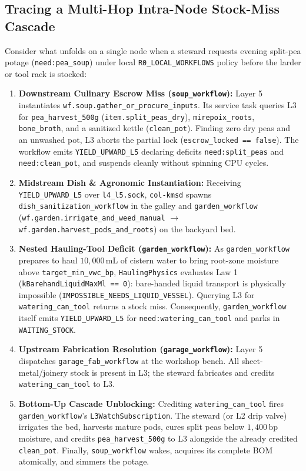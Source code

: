 \subsection{Tracing a Multi-Hop Intra-Node Stock-Miss Cascade}

Consider what unfolds on a single node when a steward requests evening split-pea potage
(\texttt{need:pea\_soup}) under local \texttt{R0\_LOCAL\_WORKFLOWS} policy before the larder or tool rack
is stocked:

\begin{enumerate}
    \item \textbf{Downstream Culinary Escrow Miss (\texttt{soup\_workflow}):} Layer 5 instantiates
        \texttt{wf.soup.gather\_or\_procure\_inputs}. Its service task queries L3 for
        \texttt{pea\_harvest\_500g} (\texttt{item.split\_peas\_dry}), \texttt{mirepoix\_roots},
        \texttt{bone\_broth}, and a sanitized kettle (\texttt{clean\_pot}). Finding zero dry peas and an
        unwashed pot, L3 aborts the partial lock (\texttt{escrow\_locked == false}). The workflow emits
        \texttt{YIELD\_UPWARD\_L5} declaring deficits \texttt{need:split\_peas} and
        \texttt{need:clean\_pot}, and suspends cleanly without spinning CPU cycles.
    \item \textbf{Midstream Dish \& Agronomic Instantiation:} Receiving \texttt{YIELD\_UPWARD\_L5} over
        \texttt{l4\_l5.sock}, \texttt{col-kmsd} spawns \texttt{dish\_sanitization\_workflow} in the galley
        and \texttt{garden\_workflow} (\texttt{wf.garden.irrigate\_and\_weed\_manual} $\to$
        \texttt{wf.garden.harvest\_pods\_and\_roots}) on the backyard bed.
    \item \textbf{Nested Hauling-Tool Deficit (\texttt{garden\_workflow}):} As \texttt{garden\_workflow}
        prepares to haul $10{,}000\,\mathrm{mL}$ of cistern water to bring root-zone moisture above
        \texttt{target\_min\_vwc\_bp}, \texttt{HaulingPhysics} evaluates Law 1
        (\texttt{kBarehandLiquidMaxMl == 0}): bare-handed liquid transport is physically impossible
        (\texttt{IMPOSSIBLE\_NEEDS\_LIQUID\_VESSEL}). Querying L3 for \texttt{watering\_can\_tool} returns
        a stock miss. Consequently, \texttt{garden\_workflow} itself emits \texttt{YIELD\_UPWARD\_L5} for
        \texttt{need:watering\_can\_tool} and parks in \texttt{WAITING\_STOCK}.
    \item \textbf{Upstream Fabrication Resolution (\texttt{garage\_workflow}):} Layer 5 dispatches
        \texttt{garage\_fab\_workflow} at the workshop bench. All sheet-metal/joinery stock is present in
        L3; the steward fabricates and credits \texttt{watering\_can\_tool} to L3.
    \item \textbf{Bottom-Up Cascade Unblocking:} Crediting \texttt{watering\_can\_tool} fires
        \texttt{garden\_workflow}'s \texttt{L3WatchSubscription}. The steward (or L2 drip valve) irrigates
        the bed, harvests mature pods, cures split peas below $1{,}400\,\mathrm{bp}$ moisture, and credits
        \texttt{pea\_harvest\_500g} to L3 alongside the already credited \texttt{clean\_pot}. Finally,
        \texttt{soup\_workflow} wakes, acquires its complete BOM atomically, and simmers the potage.
\end{enumerate}

